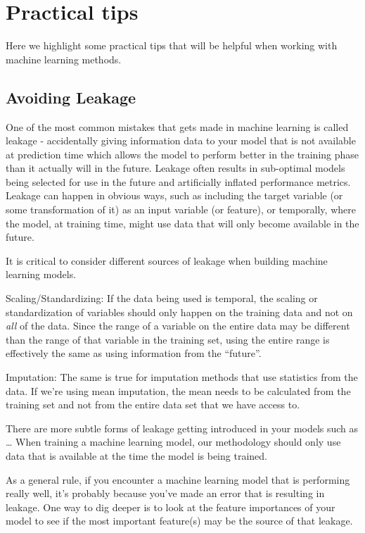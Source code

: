 \documentclass[]{krantz}
\begin{document}
\section{Practical tips}\label{practical-tips}

Here we highlight some practical tips that will be helpful when working
with machine learning methods.

\subsection{Avoiding Leakage}\label{avoiding-leakage}

One of the most common mistakes that gets made in machine learning is
called leakage - accidentally giving information data to your model that
is not available at prediction time which allows the model to perform
better in the training phase than it actually will in the future.
Leakage often results in sub-optimal models being selected for use in
the future and artificially inflated performance metrics. Leakage can
happen in obvious ways, such as including the target variable (or some
transformation of it) as an input variable (or feature), or temporally,
where the model, at training time, might use data that will only become
available in the future.

It is critical to consider different sources of leakage when building
machine learning models.

Scaling/Standardizing: If the data being used is temporal, the scaling
or standardization of variables should only happen on the training data
and not on \emph{all} of the data. Since the range of a variable on the
entire data may be different than the range of that variable in the
training set, using the entire range is effectively the same as using
information from the ``future''.

Imputation: The same is true for imputation methods that use statistics
from the data. If we're using mean imputation, the mean needs to be
calculated from the training set and not from the entire data set that
we have access to.

There are more subtle forms of leakage getting introduced in your models
such as \ldots{} When training a machine learning model, our methodology
should only use data that is available at the time the model is being
trained.

As a general rule, if you encounter a machine learning model that is
performing really well, it's probably because you've made an error that
is resulting in leakage. One way to dig deeper is to look at the feature
importances of your model to see if the most important feature(s) may be
the source of that leakage.
\end{document}
